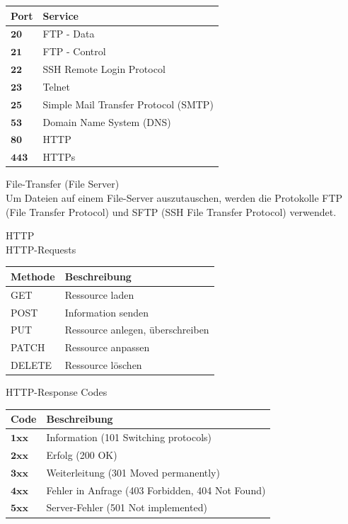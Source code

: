 \begin{center}
\begin{tabular}{|l|l|}
\hline
Port & Service \\
\hline
$\mathbf{2 0}$ & FTP - Data \\
\hline
$\mathbf{2 1}$ & FTP - Control \\
\hline
$\mathbf{2 2}$ & SSH Remote Login Protocol \\
\hline
$\mathbf{2 3}$ & Telnet \\
\hline
$\mathbf{2 5}$ & Simple Mail Transfer Protocol (SMTP) \\
\hline
$\mathbf{5 3}$ & Domain Name System (DNS) \\
\hline
$\mathbf{8 0}$ & HTTP \\
\hline
$\mathbf{4 4 3}$ & HTTPs \\
\hline
\end{tabular}
\end{center}

File-Transfer (File Server)\\
Um Dateien auf einem File-Server auszutauschen, werden die Protokolle FTP (File Transfer Protocol) und SFTP (SSH File Transfer Protocol) verwendet.

HTTP\\
HTTP-Requests

\begin{center}
\begin{tabular}{|l|l|}
\hline
Methode & Beschreibung \\
\hline
GET & Ressource laden \\
\hline
POST & Information senden \\
\hline
PUT & Ressource anlegen, überschreiben \\
\hline
PATCH & Ressource anpassen \\
\hline
DELETE & Ressource löschen \\
\hline
\end{tabular}
\end{center}

HTTP-Response Codes

\begin{center}
\begin{tabular}{|l|l|}
\hline
Code & Beschreibung \\
\hline
$\mathbf{1 x x}$ & Information (101 Switching protocols) \\
\hline
$\mathbf{2 x x}$ & Erfolg (200 OK) \\
\hline
$\mathbf{3 x x}$ & Weiterleitung (301 Moved permanently) \\
\hline
$\mathbf{4 x x}$ & Fehler in Anfrage (403 Forbidden, 404 Not Found) \\
\hline
$\mathbf{5 x x}$ & Server-Fehler (501 Not implemented) \\
\hline
\end{tabular}
\end{center}

